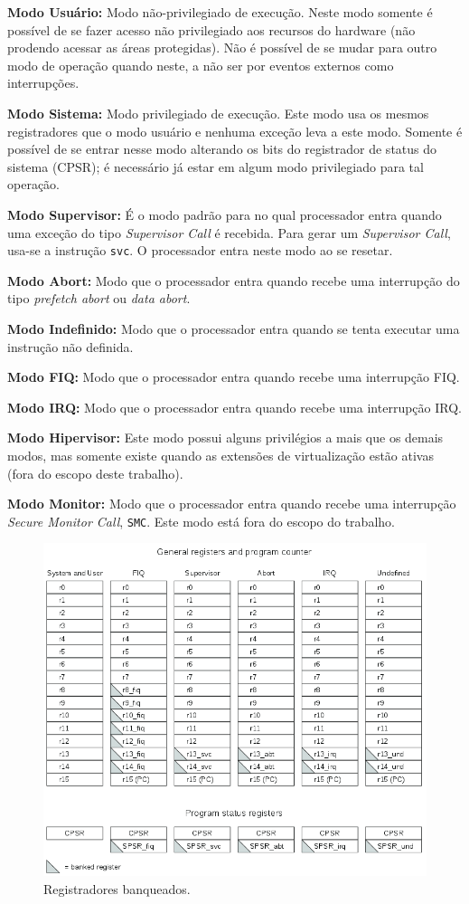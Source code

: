 \textbf{Modo Usuário:} Modo não-privilegiado de execução. Neste modo somente é possível de se fazer acesso não privilegiado aos recursos do hardware (não prodendo acessar as áreas protegidas). Não é possível de se mudar para outro modo de operação quando neste, a não ser por eventos externos como interrupções.

\textbf{Modo Sistema:} Modo privilegiado de execução. Este modo usa os mesmos registradores que o modo usuário e nenhuma exceção leva a este modo. Somente é possível de se entrar nesse modo alterando os bits do registrador de status do sistema (CPSR); é necessário já estar em algum modo privilegiado para tal operação.

\textbf{Modo Supervisor:} É o modo padrão para no qual processador entra quando uma exceção do tipo \emph{Supervisor Call} é recebida.
Para gerar um \emph{Supervisor Call}, usa-se a instrução \verb+svc+. O processador entra neste modo ao se resetar.

\textbf{Modo Abort:} Modo que o processador entra quando recebe uma interrupção do tipo \emph{prefetch abort} ou \emph{data abort}.

\textbf{Modo Indefinido:} Modo que o processador entra quando se tenta executar uma instrução não definida.

\textbf{Modo FIQ:} Modo que o processador entra quando recebe uma interrupção FIQ.

\textbf{Modo IRQ:} Modo que o processador entra quando recebe uma interrupção IRQ.

\textbf{Modo Hipervisor:} Este modo possui alguns privilégios a mais que os demais modos, mas somente existe quando as extensões de virtualização estão ativas (fora do escopo deste trabalho).

\textbf{Modo Monitor:} Modo que o processador entra quando recebe uma interrupção \emph{Secure Monitor Call}, \verb+SMC+. Este modo está fora do escopo do trabalho.


\begin{figure}[ht!]
	\centerline{
    \includegraphics[width=12cm]{figuras/banked_registers}
	}
    \caption{Registradores banqueados.}
	\label{fig:banked}
\end{figure}



